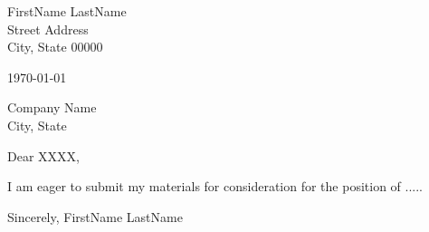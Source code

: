 \documentclass[11pt,a4paper,sans]{letter} %
\begin{document}
FirstName LastName \\ %
Street Address \\ %
City, State 00000 %

\today %

Company Name\\ %
City, State %

Dear XXXX, %

\bigbreak %


I am eager to submit my materials for consideration for the position of .....
\blindtext %

\bigbreak %

\blindtext %

\bigbreak %

\blindtext %



\bigbreak %
Sincerely,
\bigbreak %
FirstName LastName %
\end{document}
